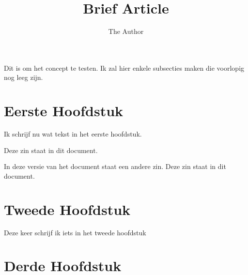 \documentclass[11pt]{amsart}
\title{Brief Article}
\author{The Author}
\begin{document}
\maketitle

Dit is om het concept te testen.
 Ik zal hier enkele subsecties maken die voorlopig nog leeg zijn.
 
 \section{Eerste Hoofdstuk}
 Ik schrijf nu wat tekst in het eerste hoofdstuk.

 Deze zin staat in dit document.

 In deze versie van het document staat een andere zin.
 Deze zin staat in dit document.

 \section{Tweede Hoofdstuk}
 Deze keer schrijf ik iets in het tweede hoofdstuk
 \section{Derde Hoofdstuk}
\end{document}
